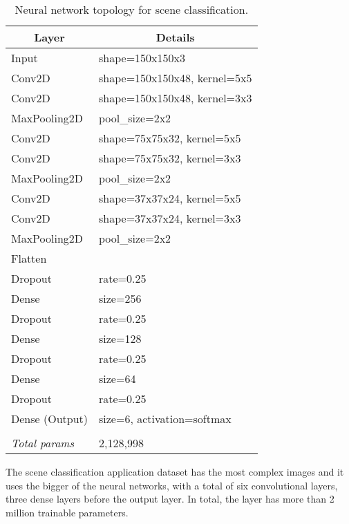 \begin{table}[thbp]
\centering
\caption{Neural network topology for scene classification.}
\label{tab:scene_nn_topo}
\begin{tabular}{|l|l|}
\hline
\multicolumn{1}{|c|}{\textbf{Layer}}          & \multicolumn{1}{|c|}{\textbf{Details}}                     \\ \hline
Input          & shape=150x150x3              \\ \hline
Conv2D         & shape=150x150x48, kernel=5x5 \\ \hline
Conv2D         & shape=150x150x48, kernel=3x3 \\ \hline
MaxPooling2D   & pool\_size=2x2               \\ \hline
Conv2D         & shape=75x75x32, kernel=5x5   \\ \hline
Conv2D         & shape=75x75x32, kernel=3x3   \\ \hline
MaxPooling2D   & pool\_size=2x2               \\ \hline
Conv2D         & shape=37x37x24, kernel=5x5   \\ \hline
Conv2D         & shape=37x37x24, kernel=3x3   \\ \hline
MaxPooling2D   & pool\_size=2x2               \\ \hline
Flatten        &                              \\ \hline
Dropout        & rate=0.25                    \\ \hline
Dense          & size=256                     \\ \hline
Dropout        & rate=0.25                    \\ \hline
Dense          & size=128                     \\ \hline
Dropout        & rate=0.25                    \\ \hline
Dense          & size=64                      \\ \hline
Dropout        & rate=0.25                    \\ \hline
Dense (Output) & size=6, activation=softmax   \\ \hline
               &                              \\ \hline
\textit{Total params}   & 2,128,998                      \\ \hline
\end{tabular}
\end{table}

The scene classification application dataset has the most complex images and it uses the bigger of the neural networks, with a total of six convolutional layers, three dense layers before the output layer. In total, the layer has more than 2 million trainable parameters.

